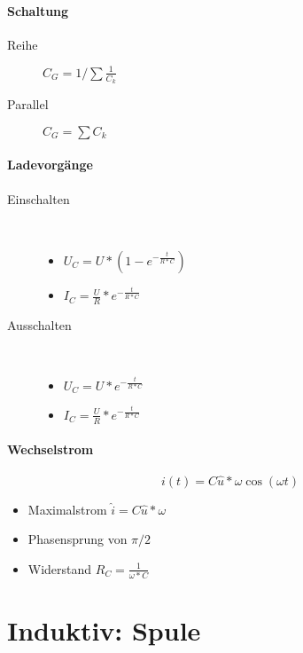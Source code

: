 \paragraph{Schaltung}

\begin{description}
  \item[Reihe] $C_G = 1/{\sum \frac{1}{C_k}}$
  \item[Parallel] $C_G = \sum C_k$
\end{description}

\paragraph{Ladevorgänge}

\begin{description}
  \item[Einschalten]\
  \begin{itemize}
    \item $U_C = U * (1 - e^{- \frac{t}{R * C}})$
    \item $I_C = \frac{U}{R} * e^{- \frac{t}{R * C}}$
  \end{itemize}

  \item[Ausschalten]\
  \begin{itemize}
    \item $U_C = U * e^{- \frac{t}{R * C}}$
    \item $I_C = \frac{U}{R} * e^{- \frac{t}{R * C}}$
  \end{itemize}
\end{description}

\paragraph{Wechselstrom}

$$i(t) = C \hat{u} * \omega \cos (\omega t)$$

\begin{itemize}
  \item Maximalstrom $\hat{i} = C \hat{u} * \omega$
  \item Phasensprung von $\pi/2$
  \item Widerstand $R_C = \frac{1}{\omega * C}$
\end{itemize}

\section{Induktiv: Spule}

